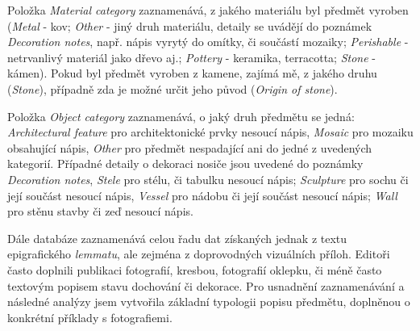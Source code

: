 \startitemize
\item
  \startblockquote
  Položka {\em Material category} zaznamenává, z jakého materiálu byl předmět vyroben ({\em Metal} - kov; {\em Other} - jiný druh materiálu, detaily se uvádějí do poznámek {\em Decoration notes}, např. nápis vyrytý do omítky, či součástí mozaiky; {\em Perishable} - netrvanlivý materiál jako dřevo aj.; {\em Pottery} - keramika, terracotta; {\em Stone} - kámen). Pokud byl předmět vyroben z kamene, zajímá mě, z jakého druhu ({\em Stone}), případně zda je možné určit jeho původ ({\em Origin of stone}).
  \stopblockquote
\item
  \startblockquote
  Položka {\em Object category} zaznamenává, o jaký druh předmětu se jedná: {\em Architectural feature} pro architektonické prvky nesoucí nápis, {\em Mosaic} pro mozaiku obsahující nápis, {\em Other} pro předmět nespadající ani do jedné z uvedených kategorií. Případné detaily o dekoraci nosiče jsou uvedené do poznámky {\em Decoration notes}, {\em Stele} pro stélu, či tabulku nesoucí nápis; {\em Sculpture} pro sochu či její součást nesoucí nápis, {\em Vessel} pro nádobu či její součást nesoucí nápis; {\em Wall} pro stěnu stavby či zeď nesoucí nápis.
  \stopblockquote
\stopitemize

Dále databáze zaznamenává celou řadu dat získaných jednak z textu epigrafického {\em lemmatu}, ale zejména z doprovodných vizuálních příloh. Editoři často doplnili publikaci fotografií, kresbou, fotografií oklepku, či méně často textovým popisem stavu dochování či dekorace. Pro usnadnění zaznamenávání a následné analýzy jsem vytvořila základní typologii popisu předmětu, doplněnou o konkrétní příklady s fotografiemi.

